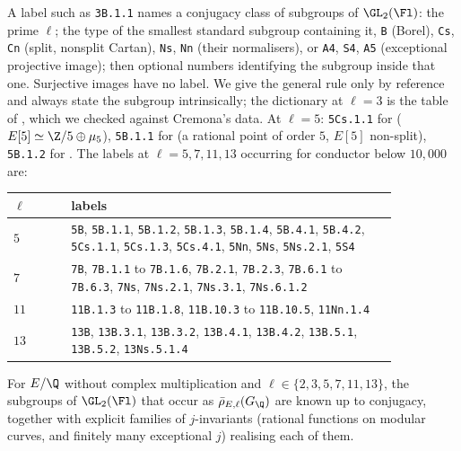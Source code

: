 \begin{convention}\label{conv:galrep:labels}
A label such as \texttt{3B.1.1} names a conjugacy class of subgroups of $\GL_2(\Fl)$: the prime $\ell$; the type of the smallest standard subgroup
containing it, \texttt{B} (Borel), \texttt{Cs}, \texttt{Cn} (split, nonsplit Cartan), \texttt{Ns}, \texttt{Nn} (their normalisers), or \texttt{A4},
\texttt{S4}, \texttt{A5} (exceptional projective image); then optional numbers identifying the subgroup inside that one. Surjective images have no
label. We give the general rule only by reference \cite{Sutherland16} and always state the subgroup intrinsically; the dictionary at $\ell=3$ is the
table of , which we checked against Cremona's data. At $\ell=5$: \texttt{5Cs.1.1} for 
($E[5]\simeq\Z/5\oplus\mu_5$), \texttt{5B.1.1} for  (a rational point of order $5$, $E[5]$ non-split), \texttt{5B.1.2} for . The labels at
$\ell=5,7,11,13$ occurring for conductor below $10{,}000$ are:
\begin{center}\small
\begin{tabular}{lp{0.85\linewidth}}
\toprule
$\ell$ & labels\\
\midrule
$5$ & \texttt{5B}, \texttt{5B.1.1}, \texttt{5B.1.2}, \texttt{5B.1.3}, \texttt{5B.1.4}, \texttt{5B.4.1}, \texttt{5B.4.2}, \texttt{5Cs.1.1}, \texttt{5Cs.1.3}, \texttt{5Cs.4.1},
\texttt{5Nn}, \texttt{5Ns}, \texttt{5Ns.2.1}, \texttt{5S4}\\
$7$ & \texttt{7B}, \texttt{7B.1.1} to \texttt{7B.1.6}, \texttt{7B.2.1}, \texttt{7B.2.3}, \texttt{7B.6.1} to \texttt{7B.6.3}, \texttt{7Ns}, \texttt{7Ns.2.1}, \texttt{7Ns.3.1},
\texttt{7Ns.6.1.2}\\
$11$ & \texttt{11B.1.3} to \texttt{11B.1.8}, \texttt{11B.10.3} to \texttt{11B.10.5}, \texttt{11Nn.1.4}\\
$13$ & \texttt{13B}, \texttt{13B.3.1}, \texttt{13B.3.2}, \texttt{13B.4.1}, \texttt{13B.4.2}, \texttt{13B.5.1}, \texttt{13B.5.2}, \texttt{13Ns.5.1.4}\\
\bottomrule
\end{tabular}
\end{center}
\end{convention}

\begin{theorem}[Zywina]\label{thm:galrep:zywina}
For $E/\Q$ without complex multiplication and $\ell\in\{2,3,5,7,11,13\}$, the subgroups of $\GL_2(\Fl)$ that occur as $\bar\rho_{E,\ell}(G_\Q)$ are known up to conjugacy,
together with explicit families of $j$-invariants (rational functions on modular curves, and finitely many exceptional $j$) realising each of them.
\end{theorem}

